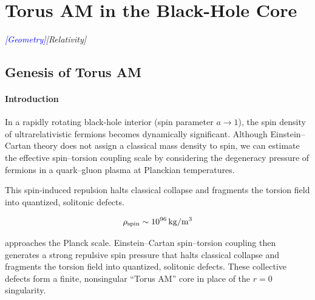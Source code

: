 \documentclass{article}
\newcommand{\geometrytag}{\textcolor{blue}{\textit{[Geometry]}}}
\newcommand{\grtag}{\textcolor{blue!40!black}{\textit{[Relativity]}}}
\begin{document}
\medskip
\begin{center}
\end{center}
\medskip





\section{Torus AM in the Black-Hole Core}
\label{sec:torus-core}
\label{sec:torus-stability}
\geometrytag  \grtag

\subsection{Genesis of Torus AM}
\label{sec:genesis-torus}
\paragraph{Introduction}
In a rapidly rotating black-hole interior (spin parameter \(a \to 1\)), the spin density of ultrarelativistic fermions becomes dynamically significant. Although Einstein–Cartan theory does not assign a classical mass density to spin, we can estimate the effective spin–torsion coupling scale by considering the degeneracy pressure of fermions in a quark–gluon plasma at Planckian temperatures.

This spin-induced repulsion halts classical collapse and fragments the torsion field into quantized, solitonic defects.

\begin{equation}
  \rho_{\rm spin}\sim10^{96}\,\mathrm{kg/m^3}
\end{equation}


approaches the Planck scale.  Einstein–Cartan spin–torsion coupling then generates a strong repulsive
spin pressure that halts classical collapse and fragments the torsion field into quantized, solitonic
defects.  These collective defects form a finite, nonsingular “Torus AM” core in place of the \(r=0\)
singularity.
\end{document}
